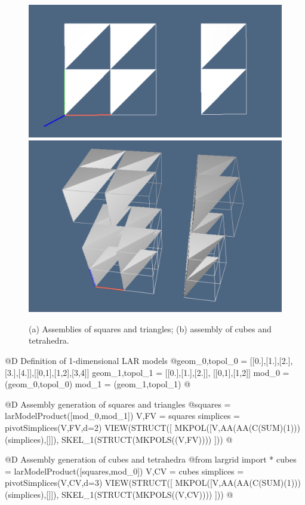 \documentclass[11pt,oneside]{article}	%
\begin{document}
\begin{figure}[htbp] %
   \centering
   \includegraphics[width=0.405\linewidth]{images/assembly1} 
   \includegraphics[width=0.315\linewidth]{images/assembly2} 
   \caption{(a) Assemblies of squares and triangles; (b) assembly of cubes and tetrahedra.}
   \label{fig:example}
\end{figure}

@D Definition of 1-dimensional LAR models 
@{geom_0,topol_0 = [[0.],[1.],[2.],[3.],[4.]],[[0,1],[1,2],[3,4]]
geom_1,topol_1 = [[0.],[1.],[2.]], [[0,1],[1,2]]
mod_0 = (geom_0,topol_0)
mod_1 = (geom_1,topol_1)
@}

@D Assembly generation of squares and triangles
@{squares = larModelProduct([mod_0,mod_1])
V,FV = squares
simplices = pivotSimplices(V,FV,d=2)
VIEW(STRUCT([ MKPOL([V,AA(AA(C(SUM)(1)))(simplices),[]]),
			  SKEL_1(STRUCT(MKPOLS((V,FV)))) ]))
@}

@D Assembly generation  of cubes and tetrahedra 
@{from largrid import *
cubes = larModelProduct([squares,mod_0])
V,CV = cubes
simplices = pivotSimplices(V,CV,d=3)
VIEW(STRUCT([ MKPOL([V,AA(AA(C(SUM)(1)))(simplices),[]]),
			  SKEL_1(STRUCT(MKPOLS((V,CV)))) ]))
@}









\end{document}
